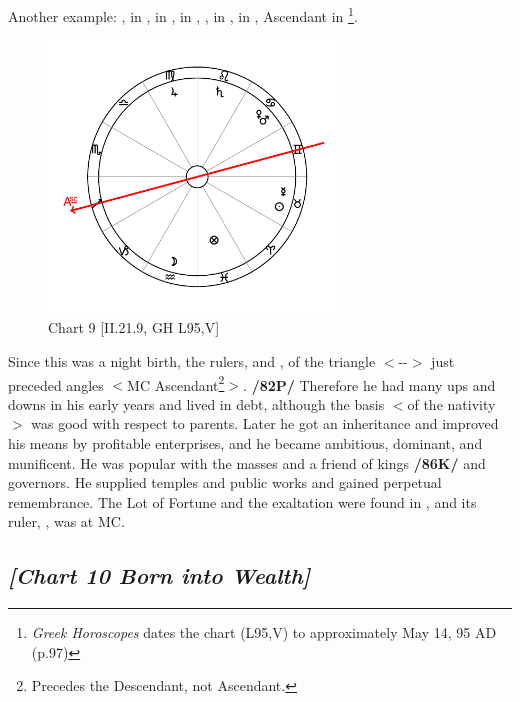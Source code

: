 Another example: \Sun, \Mercury\xspace in \Taurus, \Moon\xspace in \Aquarius, \Saturn\xspace in \Leo, \Mars, \Venus\xspace in \Cancer, \Jupiter\xspace in \Virgo, Ascendant in \Sagittarius
\footnote{\textit{Greek Horoscopes} dates the chart (L95,V) to approximately May 14, 95 AD (p.97)}.

\clearpage
\begin{figure}
\centering
\vspace{-20pt}
\includegraphics[width=0.68\textwidth]{charts/2_21_9}
\caption{Chart 9 [II.21.9, GH L95,V]}
\label{fig:chart09}
\end{figure}

Since this was a night birth, the rulers, \Saturn\xspace and \Mercury, of the triangle $<$\Gemini-\Libra-\Aquarius$>$ just preceded angles $<$MC Ascendant\footnote{Precedes the Descendant, not Ascendant.}$>$. \textbf{/82P/} Therefore he had many ups and downs in his early years and lived in debt, although the basis $<$of the nativity$>$ was good
with respect to parents. Later he got an inheritance and improved his means by profitable enterprises, and he became ambitious, dominant, and munificent. He was popular with the masses and a friend of kings \textbf{/86K/} and governors. He supplied temples and public works and gained perpetual remembrance. The Lot of Fortune and the exaltation were found in \Pisces, and its ruler, \Jupiter, was at MC.
\newpage
\subsection*{\textit{[Chart 10 Born into Wealth]}}

